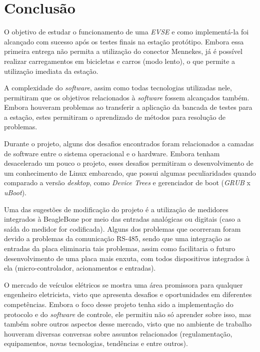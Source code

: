 \chapter{Conclusão}
\label{stateofart:conclusion}

  O objetivo de estudar o funcionamento de uma \textit{\ac{EVSE}} e como implementá-la foi alcançado com sucesso após os testes finais na estação protótipo. Embora essa primeira entrega não permita a utilização do conector Mennekes, já é possível realizar carregamentos em bicicletas e carros (modo lento), o que permite a utilização imediata da estação.

  A complexidade do \textit{software}, assim como todas tecnologias utilizadas nele, permitiram que os objetivos relacionados à \textit{software} fossem alcançados também. Embora houveram problemas ao transferir a aplicação da bancada de testes para a estação, estes permitiram o aprendizado de métodos para resolução de problemas.

  Durante o projeto, alguns dos desafios encontrados foram relacionados a camadas de software entre o sistema operacional e o hardware. Embora tenham desacelerado um pouco o projeto, esses desafios permitiram o desenvolvimento de um conhecimento de Linux embarcado, que possui algumas peculiaridades quando comparado a versão \textit{desktop}, como \textit{Device Trees} e gerenciador de boot (\textit{GRUB} x \textit{uBoot}).

  Uma das sugestões de modificação do projeto é a utilização de medidores integrados à BeagleBone por meio das entradas analógicas ou digitais (caso a saída do medidor for codificada). Alguns dos problemas que ocorreram foram devido a problemas da comunicação RS-485, sendo que uma integração as entradas da placa eliminaria tais problemas, assim como facilitaria o futuro desenvolvimento de uma placa mais enxuta, com todos dispositivos integrados à ela (micro-controlador, acionamentos e entradas).
  
  O mercado de veículos elétricos se mostra uma área promissora para qualquer engenheiro eletricista, visto que apresenta desafios e oportunidades em diferentes competências. Embora o foco desse projeto tenha sido a implementação do protocolo e do \textit{software} de controle, ele permitiu não só aprender sobre isso, mas também sobre outros aspectos desse mercado, visto que no ambiente de trabalho houveram diversas conversas sobre assuntos relacionados (regulamentação, equipamentos, novas tecnologias, tendências e entre outros).

